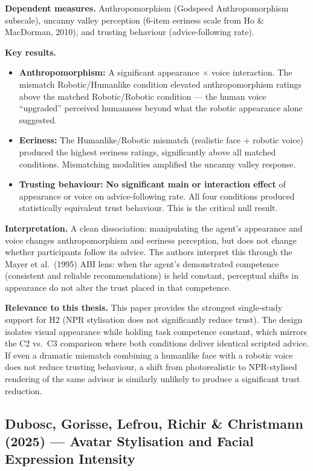 \documentclass[11pt, a4paper]{article}
\begin{document}
\textbf{Dependent measures.} Anthropomorphism (Godspeed Anthropomorphism subscale), uncanny valley perception (6-item eeriness scale from Ho \& MacDorman, 2010), and trusting behaviour (advice-following rate).

\textbf{Key results.}
\begin{itemize}[leftmargin=2em]
  \item \textbf{Anthropomorphism:} A significant appearance $\times$ voice interaction. The mismatch Robotic/Humanlike condition elevated anthropomorphism ratings above the matched Robotic/Robotic condition --- the human voice ``upgraded'' perceived humanness beyond what the robotic appearance alone suggested.
  \item \textbf{Eeriness:} The Humanlike/Robotic mismatch (realistic face + robotic voice) produced the highest eeriness ratings, significantly above all matched conditions. Mismatching modalities amplified the uncanny valley response.
  \item \textbf{Trusting behaviour:} \textbf{No significant main or interaction effect} of appearance or voice on advice-following rate. All four conditions produced statistically equivalent trust behaviour. This is the critical null result.
\end{itemize}

\textbf{Interpretation.} A clean dissociation: manipulating the agent's appearance and voice changes anthropomorphism and eeriness perception, but does not change whether participants follow its advice. The authors interpret this through the Mayer et al.\ (1995) ABI lens: when the agent's demonstrated competence (consistent and reliable recommendations) is held constant, perceptual shifts in appearance do not alter the trust placed in that competence.

\textbf{Relevance to this thesis.} This paper provides the strongest single-study support for H2 (NPR stylisation does not significantly reduce trust). The design isolates visual appearance while holding task competence constant, which mirrors the C2 vs.\ C3 comparison where both conditions deliver identical scripted advice. If even a dramatic mismatch combining a humanlike face with a robotic voice does not reduce trusting behaviour, a shift from photorealistic to NPR-stylised rendering of the same advisor is similarly unlikely to produce a significant trust reduction.

\vspace{8pt}
\subsection{Dubosc, Gorisse, Lefrou, Richir \& Christmann (2025) --- Avatar Stylisation and Facial Expression Intensity}
\end{document}
